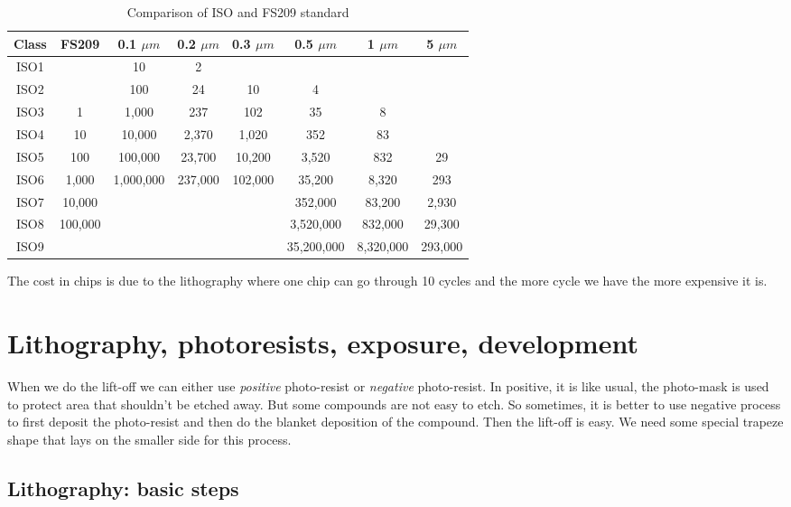\documentclass{report}
\begin{document}
\begin{table}[H]
    \centering
    \begin{tabular}{|c|c|c|c|c|c|c|c|}
    \hline
    Class & FS209 & 	0.1 $\mu m$ &	0.2 $\mu m$ &	0.3 $\mu m$ 	&0.5 $\mu m$ 	&1 $\mu m$ &	5 $\mu m$\\
    \hline
    ISO1& 	&10& 	2 	  	&&&&\\  	  	 
    \hline
    ISO2& 	&100 &	24& 	10& 	4 	& & \\  	 
    \hline
    ISO3& 1	&1,000 	&237 	&102 	&35 &	8 	 & \\
    \hline
    ISO4& 	10&10,000 &	2,370 	&1,020 &	352 	&83 	&\\
    \hline
    ISO5& 	100&100,000 	&23,700 	&10,200 	&3,520 	&832 &	29\\
    \hline
    ISO6 &	1,000&1,000,000& 	237,000 	&102,000& 	35,200& 	8,320 	&293 \\
    \hline
    ISO7 &	10,000& & & 	&  	  	352,000& 	83,200 	&2,930 \\
    \hline
    ISO8 &	100,000& & 	&&  	  	3,520,000& 	832,000 &	29,300\\
    \hline
    ISO9 &	& & 	 && 	  	35,200,000& 	8,320,000& 	293,000\\
    \hline
    
    \end{tabular}
    \caption{Comparison of ISO and FS209 standard}
    \label{tab:my_label}
\end{table}

The cost in chips is due to the lithography where one chip can go through 10 cycles and the more cycle we have the more expensive it is.

\chapter{Lithography, photoresists, exposure, development}

When we do the lift-off we can either use \textit{positive} photo-resist or \textit{negative} photo-resist. In positive, it is like usual, the photo-mask is used to protect area that shouldn't be etched away. But some compounds are not easy to etch. So sometimes, it is better to use negative process to first deposit the photo-resist and then do the blanket deposition of the compound. Then the lift-off is easy. We need some special trapeze shape that lays on the smaller side for this process. 

\section{Lithography: basic steps}
\end{document}
